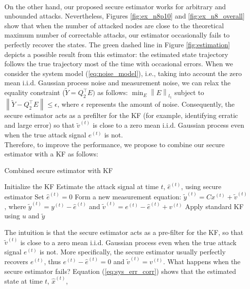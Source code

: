 \documentclass[twocolumn]{autart}    %
\newcommand{\norm}[1]{\left\lVert#1\right\rVert}
\newcommand{\rev}[1]{{\normalsize{{{\color{blue}#1}}}}}
\newcommand{\qie}[1]{{\normalsize{{{\color{magenta}#1}}}}}
\begin{document}
\\
On the other hand, our proposed secure \rev{estimator} works for arbitrary and unbounded attacks.
Nevertheless, Figures \ref{fig:ex_n8p10} and \ref{fig:ex_n8_overall} show that when the number of attacked nodes are close to the theoretical maximum number of correctable \rev{attacks}, our \rev{estimator} occasionally fails to perfectly recover the states.
The green dashed line in Figure \ref{fig:estimation} depicts a possible result from this \rev{estimator}: the estimated state trajectory follows the true trajectory most of the time with occasional errors.
\rev{ When we consider the system model (\ref{eq:noise_model}), i.e., taking into account the zero mean i.i.d. Gaussian process noise and measurement noise, we can relax the equality constraint ($\tilde Y = Q_2 ^\top E)$ as follows: $\min_E \norm{E}_{l_1}$ subject to $\norm { \tilde Y - Q_2^\top E}\le \epsilon$, \qie{where $\epsilon$ represents the amount of noise}. Consequently, the secure \rev{estimator} acts as a prefilter for the KF (for example, identifying erratic and large error) so that $\tilde v^{(t)}$ is close to a zero mean i.i.d. Gaussian process even when the true attack signal $e^{(t)}$ is not. }
\\
Therefore, to improve the performance, we propose to combine our secure \rev{estimator} with a KF as follows:
\begin{algorithm}
\caption{Combined secure estimator with KF}
\label{al:se_kf}
\begin{algorithmic}[1]
\State Initialize the KF
		\State Estimate the attack signal at time $t$, $\hat e^{(t)}$, using secure estimator
	\Else
		\State Set $\hat e^{(t)} = 0$
	\EndIf
	\State Form a new measurement equation: $\tilde y^{(t)} =  C x^{(t)} + \tilde v^{(t)}$, where $\tilde y^{(t)} = y^{(t)} - \hat e^{(t)}$ and $ \tilde v^{(t)} = e ^{(t)} - \hat e^{(t)} + v^{(t)}$
	\State Apply standard KF using $u$ and $\tilde y$ 
\EndFor
\end{algorithmic}
\end{algorithm}
The intuition is that the secure \rev{estimator} acts as a pre-filter for the KF, so that $\tilde v^{(t)}$ is close to a zero mean i.i.d. Gaussian process even when the true attack signal $e^{(t)}$ is not. More specifically, the secure \rev{estimator} usually perfectly recovers $e^{(t)}$, thus $e^{(t)} - \hat e^{(t)} = 0$ and $\tilde v^{(t)} = v^{(t)}$. What happens when the secure \rev{estimator} fails? Equation (\ref{eq:sys_err_corr}) shows that the estimated state at time $t$, $\hat x^{(t)}$, %
\end{document}
